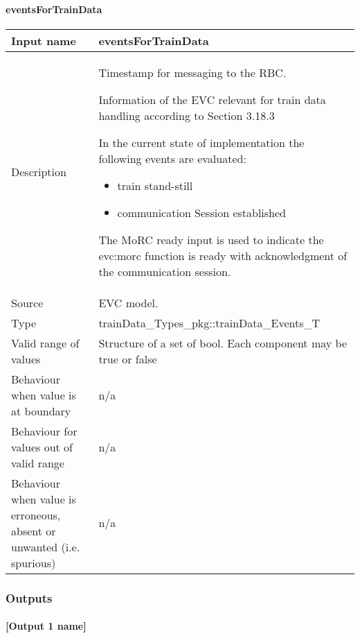 \paragraph{eventsForTrainData}

\begin{longtable}{p{}p{}}
\toprule
Input name				& eventsForTrainData\\
\midrule
Description				& Timestamp for messaging to the RBC.

Information of the EVC relevant for train data handling according to Section 3.18.3

In the current state of implementation the following events are evaluated:
\begin{itemize}
\item train stand-still
\item communication Session established
\end{itemize}
The MoRC ready input is used to indicate the evc:morc function is ready with acknowledgment of the communication session.\\
\midrule
Source					& EVC model.\\ 
\midrule
Type					& trainData\_Types\_pkg::trainData\_Events\_T\\
\midrule
Valid range of values	& Structure of a set of bool. Each component may be true or false\\
\midrule
Behaviour when value is at boundary	& n/a\\
\midrule
Behaviour for values out of valid range	& n/a\\
\midrule
Behaviour when value is erroneous, absent or unwanted (i.e. spurious) & n/a\\

\bottomrule
\end{longtable}

\subsubsection{Outputs}\label{s:traindata_outputs}
\paragraph{[Output 1 name]}

